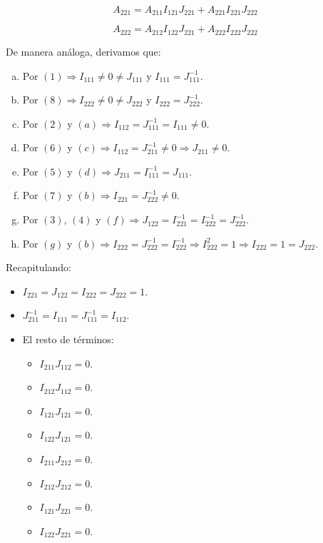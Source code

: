\documentclass[a4paper, titlepage]{article}
\begin{document}
\begin{equation}
A_{221} = A_{211} I_{121} J_{221} + A_{221} I_{221} J_{222}
\end{equation}

\begin{equation}
A_{222} = A_{212} I_{122} J_{221} + A_{222} I_{222} J_{222}
\end{equation}

De manera análoga, derivamos que:

\begin{enumerate}[(a)]
	\item Por $(1) \Rightarrow I_{111} \neq 0 \neq J_{111}$ y $I_{111} = J_{111}^{-1}$.
	\item Por $(8) \Rightarrow I_{222} \neq 0 \neq J_{222}$ y $I_{222} = J_{222}^{-1}$.
	\item Por $(2)$ y $(a) \Rightarrow I_{112} = J_{111}^{-1} = I_{111} \neq 0$.
	\item Por $(6)$ y $(c) \Rightarrow I_{112} = J_{211}^{-1} \neq 0 \Rightarrow J_{211} \neq 0$.
	\item Por $(5)$ y $(d) \Rightarrow J_{211} = I_{111}^{-1} = J_{111}$.
	\item Por $(7)$ y $(b) \Rightarrow I_{221} = J_{222}^{-1} \neq 0$.
	\item Por $(3)$, $(4)$ y $(f) \Rightarrow J_{122} = I_{221}^{-1} = I_{222}^{-1} = J_{222}^{-1}$.
	\item Por $(g)$ y $(b) \Rightarrow I_{222} = J_{222}^{-1} = I_{222}^{-1} \Rightarrow I_{222}^2 = 1 \Rightarrow I_{222} = 1 = J_{222}$.
\end{enumerate}

\newpage

Recapitulando:

\begin{itemize}
	\item $I_{221} = J_{122} = I_{222} = J_{222} = 1$.
	\item $J_{211}^{-1} = I_{111} = J_{111}^{-1} = I_{112}$.
	\item El resto de términos:

	\begin{itemize}
		\item $I_{211} J_{112} = 0$.
		\item $I_{212} J_{112} = 0$.
		\item $I_{121} J_{121} = 0$.
		\item $I_{122} J_{121} = 0$.
		\item $I_{211} J_{212} = 0$.
		\item $I_{212} J_{212} = 0$.
		\item $I_{121} J_{221} = 0$.
		\item $I_{122} J_{221} = 0$.
	\end{itemize}
\end{itemize}
\end{document}
